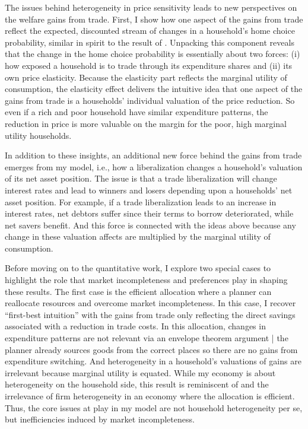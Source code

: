 \documentclass[12pt,pdftex]{article}
\begin{document}
\begin{onehalfspacing}
The issues behind heterogeneity in price sensitivity leads to new perspectives on the welfare gains from trade. First, I show how one aspect of the gains from trade reflect the expected, discounted stream of changes in a household's home choice probability, similar in spirit to the result of \citet*{arkolakis2012new}. Unpacking this component reveals that the change in the home choice probability is essentially about two forces: (i) how exposed a household is to trade through its expenditure shares and (ii) its own price elasticity. Because the elasticity part reflects the marginal utility of consumption, the elasticity effect delivers the intuitive idea that one aspect of the gains from trade is a households' individual valuation of the price reduction. So even if a rich and poor household have similar expenditure patterns, the reduction in price is more valuable on the margin for the poor, high marginal utility households.

In addition to these insights, an additional new force behind the gains from trade emerges from my model, i.e., how a liberalization changes a household's valuation of its net asset position. The issue is that a trade liberalization will change interest rates and lead to winners and losers depending upon a households' net asset position. For example, if a trade liberalization leads to an increase in interest rates, net debtors suffer since their terms to borrow deteriorated, while net savers benefit. And this force is connected with the ideas above because any change in these valuation affects are multiplied by the marginal utility of consumption.

Before moving on to the quantitative work, I explore two special cases to highlight the role that market incompleteness and preferences play in shaping these results. The first case is the efficient allocation where a planner can reallocate resources and overcome market incompleteness. In this case, I recover ``first-best intuition'' with the gains from trade only reflecting the direct savings associated with a reduction in trade costs. In this allocation, changes in expenditure patterns are not relevant via an envelope theorem argument | the planner already sources goods from the correct places so there are no gains from expenditure switching. And heterogeneity in a household's valuations of gains are irrelevant because marginal utility is equated. While my economy is about heterogeneity on the household side, this result is reminiscent of \citet{AtkesonBurstein2010} and the irrelevance of firm heterogeneity in an economy where the allocation is efficient. Thus, the core issues at play in my model are not household heterogeneity per se, but inefficiencies induced by market incompleteness.


\end{onehalfspacing}
\end{document}
